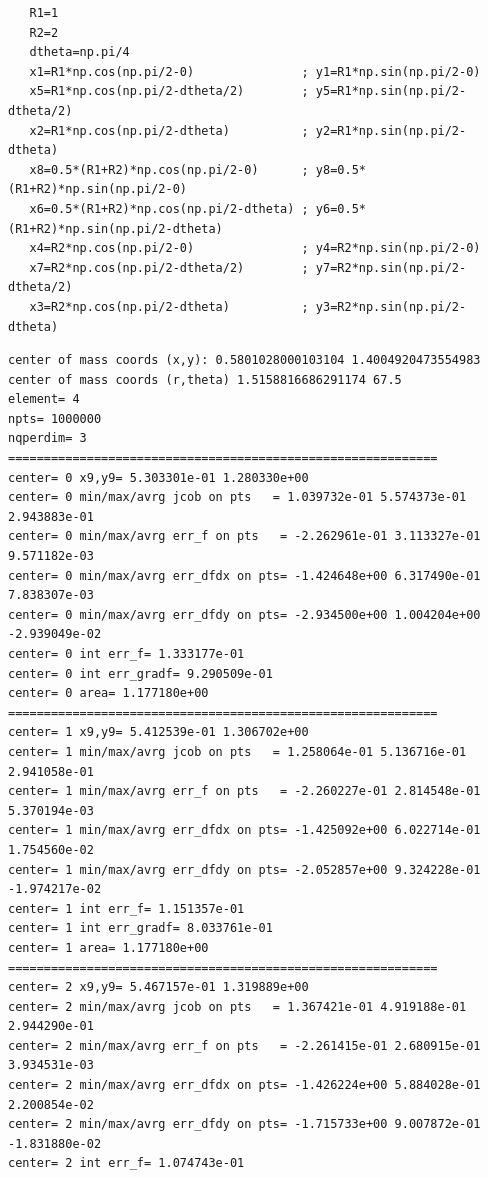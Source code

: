 \begin{lstlisting}
   R1=1
   R2=2
   dtheta=np.pi/4
   x1=R1*np.cos(np.pi/2-0)               ; y1=R1*np.sin(np.pi/2-0) 
   x5=R1*np.cos(np.pi/2-dtheta/2)        ; y5=R1*np.sin(np.pi/2-dtheta/2) 
   x2=R1*np.cos(np.pi/2-dtheta)          ; y2=R1*np.sin(np.pi/2-dtheta) 
   x8=0.5*(R1+R2)*np.cos(np.pi/2-0)      ; y8=0.5*(R1+R2)*np.sin(np.pi/2-0)  
   x6=0.5*(R1+R2)*np.cos(np.pi/2-dtheta) ; y6=0.5*(R1+R2)*np.sin(np.pi/2-dtheta) 
   x4=R2*np.cos(np.pi/2-0)               ; y4=R2*np.sin(np.pi/2-0)   
   x7=R2*np.cos(np.pi/2-dtheta/2)        ; y7=R2*np.sin(np.pi/2-dtheta/2)   
   x3=R2*np.cos(np.pi/2-dtheta)          ; y3=R2*np.sin(np.pi/2-dtheta)   
\end{lstlisting}



\begin{tiny}
\begin{verbatim}
center of mass coords (x,y): 0.5801028000103104 1.4004920473554983
center of mass coords (r,theta) 1.5158816686291174 67.5
element= 4
npts= 1000000
nqperdim= 3
============================================================
center= 0 x9,y9= 5.303301e-01 1.280330e+00 
center= 0 min/max/avrg jcob on pts   = 1.039732e-01 5.574373e-01 2.943883e-01
center= 0 min/max/avrg err_f on pts   = -2.262961e-01 3.113327e-01 9.571182e-03
center= 0 min/max/avrg err_dfdx on pts= -1.424648e+00 6.317490e-01 7.838307e-03
center= 0 min/max/avrg err_dfdy on pts= -2.934500e+00 1.004204e+00 -2.939049e-02
center= 0 int err_f= 1.333177e-01
center= 0 int err_gradf= 9.290509e-01
center= 0 area= 1.177180e+00
============================================================
center= 1 x9,y9= 5.412539e-01 1.306702e+00 
center= 1 min/max/avrg jcob on pts   = 1.258064e-01 5.136716e-01 2.941058e-01
center= 1 min/max/avrg err_f on pts   = -2.260227e-01 2.814548e-01 5.370194e-03
center= 1 min/max/avrg err_dfdx on pts= -1.425092e+00 6.022714e-01 1.754560e-02
center= 1 min/max/avrg err_dfdy on pts= -2.052857e+00 9.324228e-01 -1.974217e-02
center= 1 int err_f= 1.151357e-01
center= 1 int err_gradf= 8.033761e-01
center= 1 area= 1.177180e+00
============================================================
center= 2 x9,y9= 5.467157e-01 1.319889e+00 
center= 2 min/max/avrg jcob on pts   = 1.367421e-01 4.919188e-01 2.944290e-01
center= 2 min/max/avrg err_f on pts   = -2.261415e-01 2.680915e-01 3.934531e-03
center= 2 min/max/avrg err_dfdx on pts= -1.426224e+00 5.884028e-01 2.200854e-02
center= 2 min/max/avrg err_dfdy on pts= -1.715733e+00 9.007872e-01 -1.831880e-02
center= 2 int err_f= 1.074743e-01

\end{verbatim}
\end{tiny}

